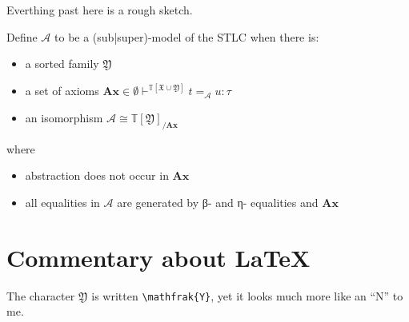 \documentclass[11pt,a4paper]{article}
\newcommand*\InFamily[4]{\ensuremath{{#2} \vdash^{#1} {#3} : {#4}}}
\newcommand*\term[1]{\ensuremath{\mathbb{T}{[{#1}]}}}
\begin{document}
Everthing past here is a rough sketch.

Define \(\mathcal{A}\) to be a (sub|super)-model\footnotemark{} of the STLC when there is:


\begin{itemize}
\item a sorted family \(\mathfrak{Y}\)
\item a set of axioms \(\mathbf{Ax} \in \InFamily{\term{\mathfrak{X}\cup\mathfrak{Y}}}{\emptyset}{t =_{\mathcal{A}} u}{\tau}\)
\item an isomorphism \(\mathcal{A} \cong \term{\mathfrak{Y}}_{/\mathbf{Ax}}\)
\end{itemize}

where

\begin{itemize}
\item abstraction does not occur in  \(\mathbf{Ax}\)
\item all equalities in \(\mathcal{A}\) are generated by β- and η- equalities and \(\mathbf{Ax}\)
\end{itemize}

\appendix
\section{Commentary about \LaTeX}

The character \(\mathfrak{Y}\) is written \verb|\mathfrak{Y}|, yet it looks much more like an ``N'' to
me.
\end{document}
